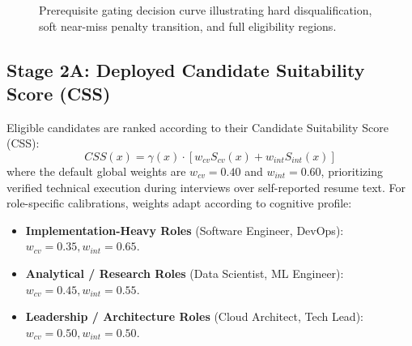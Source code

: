 \documentclass[conference]{IEEEtran}
\begin{document}
\begin{figure}[t]
\centering
{}
\caption{Prerequisite gating decision curve illustrating hard disqualification, soft near-miss penalty transition, and full eligibility regions.}
\label{fig:penalty_curve}
\end{figure}

\subsection{Stage 2A: Deployed Candidate Suitability Score (CSS)}
Eligible candidates are ranked according to their Candidate Suitability Score (CSS):
\begin{equation}
CSS(x) = \gamma(x) \cdot \left[ w_{cv} S_{cv}(x) + w_{int} S_{int}(x) \right]
\end{equation}
where the default global weights are $w_{cv} = 0.40$ and $w_{int} = 0.60$, prioritizing verified technical execution during interviews over self-reported resume text. For role-specific calibrations, weights adapt according to cognitive profile:
\begin{itemize}
    \item \textbf{Implementation-Heavy Roles} (Software Engineer, DevOps): $w_{cv} = 0.35, w_{int} = 0.65$.
    \item \textbf{Analytical / Research Roles} (Data Scientist, ML Engineer): $w_{cv} = 0.45, w_{int} = 0.55$.
    \item \textbf{Leadership / Architecture Roles} (Cloud Architect, Tech Lead): $w_{cv} = 0.50, w_{int} = 0.50$.
\end{itemize}
\end{document}
